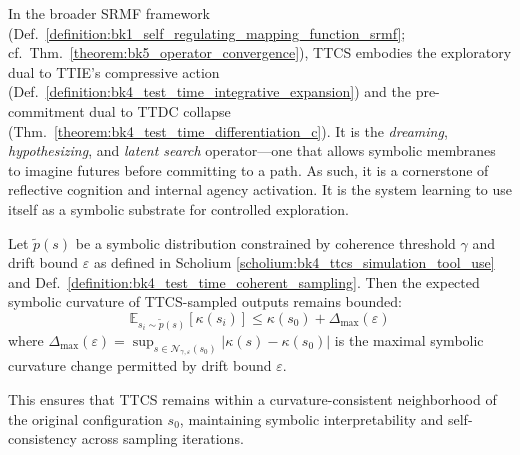 \begin{scholium}
In the broader SRMF framework (Def.~\ref{definition:bk1_self_regulating_mapping_function_srmf}; cf.~Thm.~\ref{theorem:bk5_operator_convergence}), TTCS embodies the exploratory dual to TTIE's compressive action (Def.~\ref{definition:bk4_test_time_integrative_expansion}) and the pre-commitment dual to TTDC collapse (Thm.~\ref{theorem:bk4_test_time_differentiation_c}). It is the \emph{dreaming}, \emph{hypothesizing}, and \emph{latent search} operator---one that allows symbolic membranes to imagine futures before committing to a path. As such, it is a cornerstone of reflective cognition and internal agency activation. It is the system learning to use itself as a symbolic substrate for controlled exploration.
\end{scholium}

\begin{lemma}
\label{lemma:bk4_ttcs_stability}
Let $\tilde{p}(s)$ be a symbolic distribution constrained by coherence threshold $\gamma$ and drift bound $\varepsilon$ as defined in Scholium \ref{scholium:bk4_ttcs_simulation_tool_use} and Def.~\ref{definition:bk4_test_time_coherent_sampling}. Then the expected symbolic curvature of TTCS-sampled outputs remains bounded:
\[
\mathbb{E}_{s_i \sim \tilde{p}(s)} [\kappa(s_i)] \leq \kappa(s_0) + \Delta_{\max}(\varepsilon)
\]
where $\Delta_{\max}(\varepsilon) = \sup_{s \in \mathcal{N}_{\gamma,\varepsilon}(s_0)} |\kappa(s) - \kappa(s_0)|$ is the maximal symbolic curvature change permitted by drift bound $\varepsilon$.

This ensures that TTCS remains within a curvature-consistent neighborhood of the original configuration $s_0$, maintaining symbolic interpretability and self-consistency across sampling iterations.
\end{lemma}


